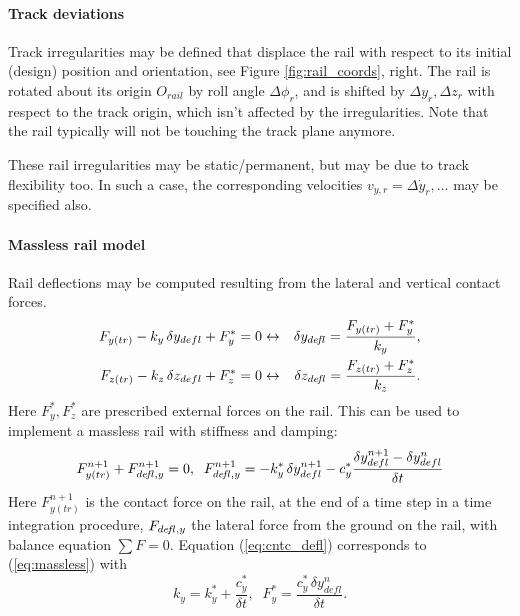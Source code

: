 \documentclass[12pt]{report}
\begin{document}
\paragraph{Track deviations}

Track irregularities may be defined that displace the rail with respect to
its initial (design) position and orientation, see Figure
\ref{fig:rail_coords}, right. The rail is rotated about its origin
$O_{rail}$ by roll angle $\Delta\phi_{r}$, and is shifted by $\Delta
y_{r},\Delta z_{r}$ with respect to the track origin, which isn't
affected by the irregularities. Note that the rail typically will not be
touching the track plane anymore.

These rail irregularities may be static/permanent, but may be due to track
flexibility too. In such a case, the corresponding velocities
$v_{y,r}=\Delta\dot{y}_{r}, \ldots$ may be specified also.

\paragraph{Massless rail model}

Rail deflections may be computed resulting from the lateral and
vertical contact forces.
\begin{eqnarray}\label{eq:cntc_defl}
   F_{y(tr)} - k_y\,\delta y_{defl} + F^*_y = 0 &\leftrightarrow&
   \delta y_{de\!f\mkern-2mul} = \frac{F_{y(tr)} + F^*_y}{ k_y } , \\
   F_{z(tr)} - k_z\,\delta z_{defl} + F^*_z = 0 &\leftrightarrow&
   \delta z_{de\!f\mkern-2mul} = \frac{F_{z(tr)} + F^*_z}{ k_z } .
\end{eqnarray}
Here $F_y^*, F_z^*$ are prescribed external forces on the rail.
This can be used to implement a massless rail with stiffness and damping:
\begin{equation}\label{eq:massless}
   F_{y(tr)}^{n+1} + F^{n+1}_{de\!f\mkern-2mul,y} = 0, \;\;
   F^{n+1}_{de\!f\mkern-2mul,y} = -k^*_y\,\delta y^{n+1}_{defl} - c^*_y \frac{\delta
        y^{n+1}_{defl} - \delta y^n_{defl}}{ \delta t }
\end{equation}
Here $F_{y(tr)}^{n+1}$ is the contact force on the rail, at the end of a
time step in a time integration procedure, $F_{de\!f\mkern-2mul,y}$ the lateral force
from the ground on the rail, with balance equation $\sum F=0$.
Equation (\ref{eq:cntc_defl}) corresponds to (\ref{eq:massless}) with
\begin{equation}
   k_y = k^*_y + \frac{c^*_y}{\delta t}, \;\; 
   F^*_y = \frac{ c^*_y\,\delta y_{defl}^n}{\delta t} .
\end{equation}
\end{document}
